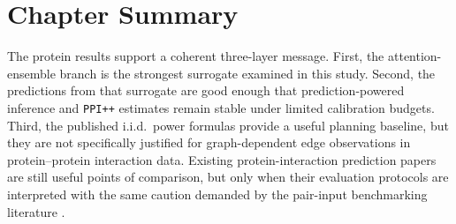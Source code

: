 \section{Chapter Summary}

The protein results support a coherent three-layer message. First, the attention-ensemble branch is the strongest surrogate examined in this study. Second, the predictions from that surrogate are good enough that prediction-powered inference and \texttt{PPI++} estimates remain stable under limited calibration budgets. Third, the published i.i.d.\ power formulas provide a useful planning baseline, but they are not specifically justified for graph-dependent edge observations in protein--protein interaction data. Existing protein-interaction prediction papers are still useful points of comparison, but only when their evaluation protocols are interpreted with the same caution demanded by the pair-input benchmarking literature \parencite{park2012, lee2023, bernett2024}.
